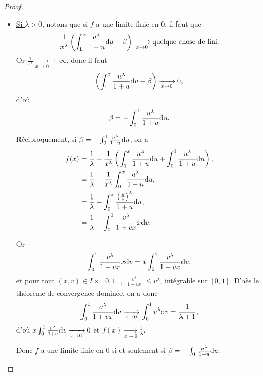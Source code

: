 \documentclass[12pt]{article}
\begin{document}
\begin{proof}
\begin{enumerate}
\begin{itemize}
\begin{itemize}
\begin{itemize}
					\item \underline{Si $\lambda>0$}, notons que si $f$ a une limite finie en 0, il faut que 
					\begin{equation*}
						\frac{1}{x^{\lambda}}\left(\int_{1}^{x}\frac{u^{\lambda}}{1+u}\mathrm{d} u-\beta\right)\xrightarrow[x\to0]{}\text{quelque chose de fini.}
					\end{equation*}
					Or $\frac{1}{x^{\lambda}}\xrightarrow[x\to0]{}+\infty$, donc il faut 
					\begin{equation*}
						\left(\int_{1}^{x}\frac{u^{\lambda}}{1+u}\mathrm{d} u-\beta\right)\xrightarrow[x\to0]{}0,
					\end{equation*}
					d'où 
					\begin{equation*}
						\beta=-\int_{0}^{1}\frac{u^{\lambda}}{1+u}\mathrm{d} u.
					\end{equation*}

					Réciproquement, si $\beta=-\int_{0}^{1}\frac{u^{\lambda}}{1+u}\mathrm{d} u$, on a 
					\begin{align*}
						f(x)
						&=\frac{1}{\lambda}-\frac{1}{x^{\lambda}}\left(\int_{1}^{x}\frac{u^{\lambda}}{1+u}\mathrm{d} u+\int_{0}^{1}\frac{u^{\lambda}}{1+u}\mathrm{d} u\right),\\
						&=\frac{1}{\lambda}-\frac{1}{x^{\lambda}}\int_{0}^{x}\frac{u^{\lambda}}{1+u}\mathrm{d} u,\\
						&=\frac{1}{\lambda}-\int_{0}^{x}\frac{\left(\frac{u}{x}\right)^{\lambda}}{1+u}\mathrm{d} u,\\
						&=\frac{1}{\lambda}-\int_{0}^{1}\frac{v^{\lambda}}{1+vx}x\mathrm{d} v.
					\end{align*}

					Or 
					\begin{equation*}
						\int_{0}^{1}\frac{v^{\lambda}}{1+vx}x\mathrm{d} v=x\int_{0}^{1}\frac{v^{\lambda}}{1+vx}\mathrm{d} v,
					\end{equation*}
					et pour tout $(x,v)\in I\times[0,1]$, $\left\lvert\frac{v^{\lambda}}{1+vx}\right\rvert\leqslant v^{\lambda}$, intégrable sur $[0,1]$. D'aès le théorème de convergence dominée, on a donc 
					\begin{equation*}
						\int_{0}^{1}\frac{v^{\lambda}}{1+vx}\mathrm{d} v\xrightarrow[x\to0]{}\int_{0}^{1}v^{\lambda}\mathrm{d} v=\frac{1}{\lambda+1},
					\end{equation*}
					d'où $x\int_{0}^{1}\frac{v^{\lambda}}{1+v}\mathrm{d} v\xrightarrow[x\to0]{}0$ et $f(x)\xrightarrow[x\to0]{}\frac{1}{\lambda}$. 

					Donc $f$ a une limite finie en 0 si et seulement si $\beta=-\int_{0}^{1}\frac{u^{\lambda}}{1+u}\mathrm{d} u$.


\end{itemize}
\end{itemize}
\end{itemize}
\end{enumerate}
\end{proof}
\end{document}
